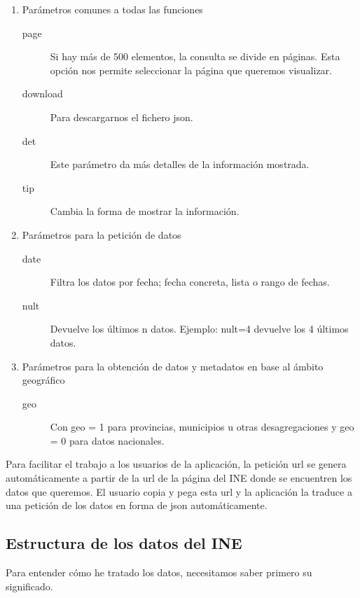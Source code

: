 \begin{description}
     \begin{enumerate}
        \item Parámetros comunes a todas las funciones
            \begin{description}
            \item [page] Si hay más de 500 elementos, la consulta se divide en páginas. Esta opción nos permite seleccionar la página que queremos visualizar.
            \item [download] Para descargarnos el fichero json.
            \item [det] Este parámetro da más detalles de la información mostrada.
            \item [tip] Cambia la forma de mostrar la información.
            \end{description}
        \item Parámetros para la petición de datos
            \begin{description}
                \item [date] Filtra los datos por fecha; fecha concreta, lista o rango de fechas.
                \item [nult] Devuelve los últimos n datos. Ejemplo: nult=4 devuelve los 4 últimos datos.
            \end{description}
        \item Parámetros para la obtención de datos y metadatos en base al ámbito geográfico
            \begin{description}
                \item [geo] Con geo = 1 para provincias, municipios u otras desagregaciones y geo = 0 para datos nacionales.
            \end{description}
        \end{enumerate}
\end{description}
 Para facilitar el trabajo a los usuarios de la aplicación, la petición url se genera automáticamente a partir de la url de la página del INE donde se encuentren los datos que queremos.
 El usuario copia y pega esta url y la aplicación la traduce a una petición de los datos en forma de json automáticamente.
 \subsection{Estructura de los datos del INE}
 Para entender cómo he tratado los datos, necesitamos saber primero su significado.




